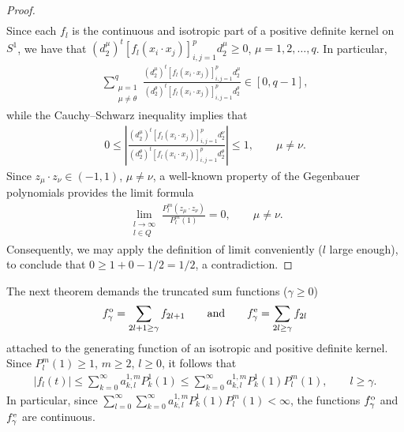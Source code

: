 \begin{proof}
\begin{gather*}
\end{gather*}
Since each $f_l$ is the continuous and isotropic part of a positive def\/inite kernel on $S^1$, we have that $(d_2^\mu)^t [f_l(x_i \cdot x_j)]_{i,j=1}^p d_2^\mu\geq 0$, $\mu=1,2,\ldots, q$. In particular,
\begin{gather*}
\sum_{\substack{\mu=1 \\ \mu \neq \theta}}^q \frac{(d_2^\mu)^t [f_l(x_i \cdot x_j)]_{i,j=1}^p d_2^\mu}{(d_2^\theta)^t [f_l(x_i \cdot x_j)]_{i,j=1}^p d_2^\theta} \in [0,q-1],
\end{gather*}
while the Cauchy--Schwarz inequality implies that
\begin{gather*}
0\leq \left|\frac{(d_2^\mu)^t [f_l(x_i \cdot x_j)]_{i,j=1}^p d_2^\nu}{(d_2^\theta)^t [f_l(x_i \cdot x_j)]_{i,j=1}^p d_2^\theta}\right|\leq 1, \qquad \mu \neq \nu.
\end{gather*}
Since $z_\mu \cdot z_\nu \in (-1,1)$, $\mu \neq \nu$, a well-known property of the Gegenbauer polynomials provides the limit formula~\cite[p.~196]{szego}
\begin{gather*}\lim_{\substack{l\to \infty \\ l\in Q}} \frac{P_l^m(z_\mu\cdot z_\nu)}{P_l^m(1)}=0, \qquad \mu \neq \nu.\end{gather*}
Consequently, we may apply the def\/inition of limit conveniently ($l$ large enough), to conclude that $0\geq 1+0-1/2=1/2$, a contradiction.
\end{proof}

The next theorem demands the truncated sum functions ($\gamma\geq 0$)
\begin{gather*}f_\gamma^{\rm o}=\sum_{2l+1\geq \gamma} f_{2l+1} \qquad \mbox{and} \qquad f_\gamma^{\rm e}= \sum_{2l \geq \gamma} f_{2l}\end{gather*}
attached to the generating function of an isotropic and positive def\/inite kernel. Since $P_l^m(1)\geq 1$, $m\geq 2$, $l\geq 0$, it follows that
\begin{gather*}
|f_l(t)| \leq \sum_{k=0}^\infty a_{k,l}^{1,m}P_k^1(1)\leq \sum_{k=0}^\infty a_{k,l}^{1,m}P_k^1(1)P_l^m(1),\qquad l\geq \gamma.
\end{gather*}
In particular, since $\sum\limits_{l=0}^\infty \sum\limits_{k=0}^\infty a_{k,l}^{1,m}P_k^1(1)P_l^m(1) <\infty$, the functions $f_\gamma^{\rm o}$ and $f_\gamma^{\rm e}$ are continuous.

